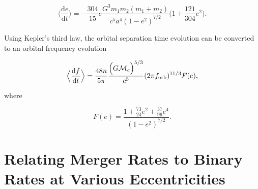 \documentclass[twocolumn]{aastex631}
\begin{document}
\begin{equation}
    \Big\langle\frac{\mathrm{d}e}{\mathrm{d}t}\Big\rangle = -\frac{304}{15} e \frac{G^3 m_1 m_2 (m_1 + m_2)}{c^5 a^4 (1-e^2)^{7/2}} \Big( 1 + \frac{121}{304} e^{2}\Big).
    \label{eq:dedt}
\end{equation}

Using Kepler's third law, the orbital separation time evolution can be converted to an orbital frequency evolution 

\begin{equation}
    \Big\langle\frac{\mathrm{d}f}{\mathrm{d}t}\Big\rangle = \frac{48 n}{5 \pi} \frac{\Big(G \mathcal{M}_c \Big)^{5/3}}{c^5} (2 \pi f_{\rm orb})^{11/3} F(e), 
    \label{eq:fdot}
\end{equation}

\noindent where 

\begin{equation}
    F(e) = \frac{1 + \frac{73}{24} e^2 + \frac{37}{96} e^4}{(1 - e^2)^{7/2}}.
    \label{eq:eccentricity_enhancement_factor}
\end{equation}


\section{Relating Merger Rates to Binary Rates at Various Eccentricities}
\end{document}

